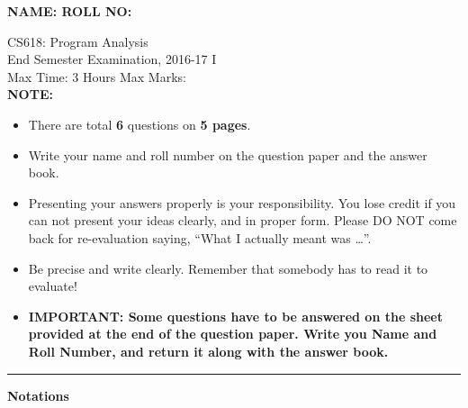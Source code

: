 \documentclass[12pt]{article}
\newcommand{\tbd}[1]{{\red #1}}
\begin{document}
{\Large\bf NAME: \hspace*{3in} ROLL NO:}

\begin{center}
CS618: Program Analysis \\
End Semester Examination, 2016-17 I\\
Max Time: 3 Hours  \hfill Max Marks: \tbd{160} \\

{\bf NOTE: }
\begin{itemize}
\item There are total {\bf 6} questions on {\bf 5 pages}.
\item Write your name and roll number on the question paper and the
  answer book.
\item Presenting your answers properly is your
  responsibility. You lose credit if you can not present your
  ideas clearly, and in proper form. Please DO NOT come back
  for re-evaluation saying, ``What I actually meant was
  \ldots''.
\item Be precise and write clearly. Remember that somebody
  has to read it to evaluate!
\item {\bf IMPORTANT: Some questions have to be answered on the
  sheet provided at the end of the question paper. Write you Name
  and Roll Number, and return it along with the answer book.}

\end{itemize}
\hrule
\end{center}


\newcommand{\pt}{\ensuremath{\pi}}
\newcommand{\fgentry}{{\sf Entry}}
\newcommand{\fgexit}{{\sf Exit}}
\begin{center}
  \Large\bf Notations
\end{center}
\newcommand{\indef}[2]{\ensuremath{{\sf BeforeIN}(#1, #2)}}
\newcommand{\outdef}[2]{\ensuremath{{\sf BeforeOut}(#1, #2)}}
\newcommand{\inuse}[2]{\ensuremath{{\sf AfterIN}(#1, #2)}}
\newcommand{\outuse}[2]{\ensuremath{{\sf AfterOut}(#1, #2)}}
\newcommand{\inacc}[2]{\ensuremath{{\sf AccIN}(#1, #2)}}
\newcommand{\outacc}[2]{\ensuremath{{\sf AccOUT}(#1, #2)}}
\newcommand{\inaccset}[2]{\ensuremath{{\sf AccSetIN}(#1, #2)}}
\newcommand{\outaccset}[2]{\ensuremath{{\sf AccSetOUT}(#1, #2)}}
\newcommand{\IN}[1]{\ensuremath{{\sf IN}(#1)}}
\newcommand{\OUT}[1]{\ensuremath{{\sf OUT}(#1)}}
\newcommand{\Pred}[1]{\ensuremath{{\sf PRED}(#1)}}
\newcommand{\Succ}[1]{\ensuremath{{\sf SUCC}(#1)}}
\newcommand{\cpath}{\ensuremath{\stackrel{+}{\longrightarrow}}}
\newcommand{\idfp}{\ensuremath{\mbox{DF}^+}}
\end{document}
